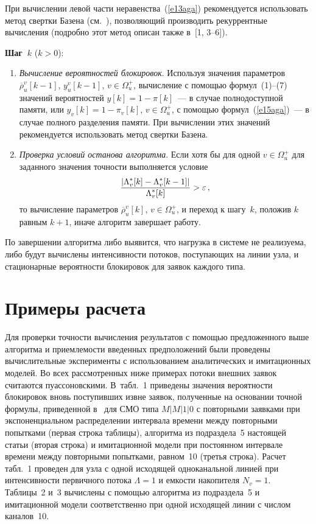 \begin{multicols}{2}
    При вычислении левой части неравенства~(\ref{e13aga}) рекомендуется 
использовать метод свертки Базена (см.~\cite{12aga}), позволяющий 
производить рекуррентные вычисления (подробно этот метод описан также 
в~[1, 3--6]).



\medskip
\textbf{Шаг~$k$} ($k > 0$):
\begin{enumerate}[1.]
\item \textit{Вычисление вероятностей блокировок}. Используя значения 
параметров $\overline{\rho}_u^v[k-1]$, $y_u^v[k-1]$, $v\in\Omega_u^+$, 
вычисление с помощью формул~(1)--(7) значений 
вероятностей $y[k]=1- \pi [k]$~--- в случае полнодоступной памяти, или 
$y_v[k]=1- \pi_v[k]$, $v\in\Omega_u^+$, с помощью формул~(\ref{e15aga})~--- в 
случае полного разделения памяти. При вычислении этих значений 
рекомендуется использовать метод свертки Базена.
    \item \textit{Проверка условий останова алгоритма}. Если хотя бы для 
одной $v\in\Omega_u^+$ для заданного значения точности   выполняется 
условие
$$
\displaystyle\frac{\displaystyle \vert \Lambda_v^*[k]-\Lambda_v^*[k-1]\vert\mathstrut}{\displaystyle \Lambda_v^*[k]\mathstrut}> \varepsilon\,,
$$
то вычисление параметров $\overline{\rho}_u^v[k]$, $v\in\Omega_u^+$, и 
переход к шагу~$k$, положив $k$ равным $k+1$, иначе алгоритм завершает 
работу. 
\end{enumerate}

    По завершении алгоритма либо выявится, что нагрузка в системе не 
реализуема, либо будут вычислены интенсивности потоков, поступающих на 
линии узла, и стационарные вероятности блокировок для заявок каждого типа. 
    
\section{Примеры расчета}

    Для проверки точности вычисления результатов с помощью 
предложенного выше алгоритма и приемлемости введенных предположений 
были проведены вычислительные эксперименты с использованием 
аналитических и имитационных моделей. Во всех рассмотренных ниже 
примерах потоки внешних заявок считаются пуассоновскими. 
В~табл.~1 приведены значения вероятности блокировок вновь 
поступивших извне заявок, полученные на основании точной формулы, 
приведенной в~\cite{4aga} для СМО типа $M\vert M\vert 1\vert 0$ с повторными 
заявками при экспоненциальном распределении интервала времени между 
повторными попытками (первая строка таблицы), алгоритма из подраздела~5 
настоящей статьи (вторая строка) и имитационной модели при постоянном 
интервале времени между повторными попытками, равном~10 (третья строка). 
Расчет табл.~1 проведен для узла с одной исходящей одноканальной 
линией при интенсивности первичного потока $\Lambda =1$ и емкости 
накопителя $N_v=1$. Таблицы~2 и~3 вычислены с помощью 
алгоритма из подраздела~5 и имитационной модели соответственно при одной 
исходящей линии с числом каналов~10.



\end{multicols}
